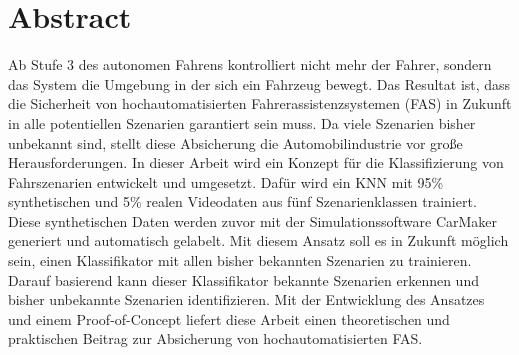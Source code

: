 

\chapter*{Abstract}

Ab Stufe 3 des autonomen Fahrens kontrolliert nicht mehr der Fahrer, sondern das System die Umgebung in der sich ein Fahrzeug bewegt. Das Resultat ist, dass die Sicherheit von hochautomatisierten Fahrerassistenzsystemen (\acs{FAS}) in Zukunft in alle potentiellen Szenarien garantiert sein muss. Da viele Szenarien bisher unbekannt sind, stellt diese Absicherung die Automobilindustrie vor große Herausforderungen. In dieser Arbeit wird ein Konzept für die Klassifizierung von Fahrszenarien entwickelt und umgesetzt. Dafür wird ein \ac{KNN} mit 95\% synthetischen und 5\% realen Videodaten aus fünf Szenarienklassen trainiert. Diese synthetischen Daten werden zuvor mit der Simulationssoftware CarMaker generiert und automatisch gelabelt. Mit diesem Ansatz soll es in Zukunft möglich sein, einen Klassifikator mit allen bisher bekannten Szenarien zu trainieren. Darauf basierend kann dieser Klassifikator bekannte Szenarien erkennen und bisher unbekannte Szenarien identifizieren. Mit der Entwicklung des Ansatzes und einem Proof-of-Concept liefert diese Arbeit einen theoretischen und praktischen Beitrag zur Absicherung von hochautomatisierten \acs{FAS}.

